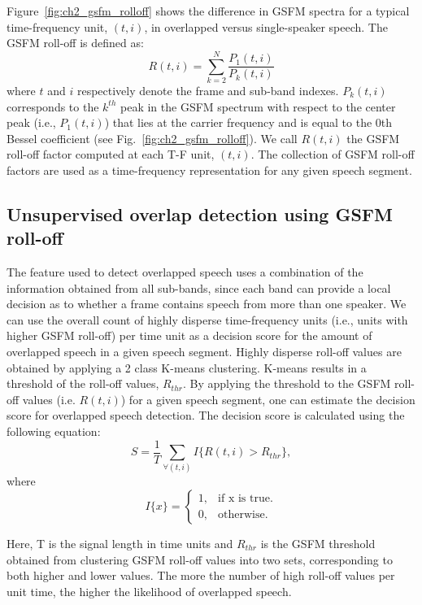 {Figure~\ref{fig:ch2_gsfm_rolloff} shows the difference in GSFM spectra for a typical time-frequency unit, $(t,i)$, in overlapped versus single-speaker speech. 
The GSFM roll-off is defined as: 
\begin{equation}
\label{eq:gsfm_rolloff}
R(t,i) = \sum\limits_{k=2}^{N} \frac{P_1(t,i)}{P_k(t,i)}
\end{equation}
where $t$ and $i$ respectively denote the frame and sub-band indexes. 
$P_k(t, i)$ corresponds to the $k^{th}$ peak in the GSFM spectrum with respect to the center peak (i.e., $P_1(t,i)$) that lies at the carrier frequency and is equal to the 0th Bessel coefficient (see Fig.~\ref{fig:ch2_gsfm_rolloff}). 
We call $R(t, i)$ the GSFM roll-off factor computed at each T-F unit, $(t, i)$. 
The collection of GSFM roll-off factors are used as a time-frequency representation for any given speech segment. 


\subsection{Unsupervised overlap detection using GSFM roll-off}
\label{sssec:unsupervised_ovl_det_gsfm}
The feature used to detect overlapped speech uses a combination of the information obtained from all sub-bands, since each band can provide a local decision as to whether a frame contains speech from more than one speaker. 
We can use the overall count of highly disperse time-frequency units (i.e., units with higher GSFM roll-off) per time unit as a decision score for the amount of overlapped speech in a given speech segment. 
Highly disperse roll-off values are obtained by applying a 2 class K-means clustering. 
K-means results in a threshold of the roll-off values, $R_{thr}$. 
By applying the threshold to the GSFM roll-off values (i.e. $R(t, i)$) for a given speech segment, one can estimate the decision score for overlapped speech detection. 
The decision score is calculated using the following equation:
\begin{equation}
\label{eq:gsfm_features}
S = \frac{1}{T}\sum\limits_{\forall (t,i)} I\{R(t,i) > R_{thr}\}, 
\end{equation}
where
\begin{equation}
I\{x\}=\begin{cases}
1, & \text{if x is true}.\\
0, & \text{otherwise}.
\end{cases}
\end{equation}

Here, T is the signal length in time units and $R_{thr}$ is the GSFM threshold obtained from clustering GSFM roll-off values into two sets, corresponding to both higher and lower values. 
The more the number of high roll-off values per unit time, the higher the likelihood of overlapped speech. 

}
